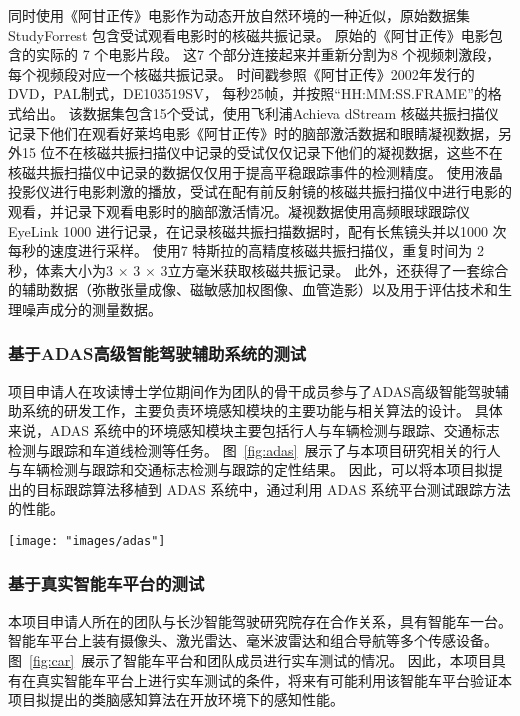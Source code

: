\documentclass[a4paper,zihao=-4]{article}
\begin{document}
同时使用《阿甘正传》电影作为动态开放自然环境的一种近似，原始数据集StudyForrest 包含受试观看电影时的核磁共振记录。
原始的《阿甘正传》电影包含的实际的 7 个电影片段。
这7 个部分连接起来并重新分割为8 个视频刺激段，每个视频段对应一个核磁共振记录。
时间戳参照《阿甘正传》2002年发行的DVD，PAL制式，DE103519SV， 每秒25帧，并按照“HH:MM:SS.FRAME”的格式给出。
该数据集包含15个受试，使用飞利浦Achieva dStream 核磁共振扫描仪记录下他们在观看好莱坞电影《阿甘正传》时的脑部激活数据和眼睛凝视数据，另外15 位不在核磁共振扫描仪中记录的受试仅仅记录下他们的凝视数据，这些不在核磁共振扫描仪中记录的数据仅仅用于提高平稳跟踪事件的检测精度。
使用液晶投影仪进行电影刺激的播放，受试在配有前反射镜的核磁共振扫描仪中进行电影的观看，并记录下观看电影时的脑部激活情况。凝视数据使用高频眼球跟踪仪EyeLink 1000 进行记录，在记录核磁共振扫描数据时，配有长焦镜头并以1000 次每秒的速度进行采样。
使用7 特斯拉的高精度核磁共振扫描仪，重复时间为 2 秒，体素大小为3 $\times$ 3 $\times$ 3立方毫米获取核磁共振记录。
此外，还获得了一套综合的辅助数据（弥散张量成像、磁敏感加权图像、血管造影）以及用于评估技术和生理噪声成分的测量数据。


\subsubsection{基于ADAS高级智能驾驶辅助系统的测试}
项目申请人在攻读博士学位期间作为团队的骨干成员参与了ADAS高级智能驾驶辅助系统的研发工作，主要负责环境感知模块的主要功能与相关算法的设计。
具体来说，ADAS 系统中的环境感知模块主要包括行人与车辆检测与跟踪、交通标志检测与跟踪和车道线检测等任务。
图~\ref{fig:adas}~展示了与本项目研究相关的行人与车辆检测与跟踪和交通标志检测与跟踪的定性结果。
因此，可以将本项目拟提出的目标跟踪算法移植到 ADAS 系统中，通过利用 ADAS 系统平台测试跟踪方法的性能。

\begin{figure*}[htb!]
	\centering  
	{\texttt{[image: "images/adas"]}
	}
	\caption{ADAS 系统中行人与车辆和交通标志检测与跟踪结果}
	\label{fig:adas}
\end{figure*}


\subsubsection{基于真实智能车平台的测试}
本项目申请人所在的团队与长沙智能驾驶研究院存在合作关系，具有智能车一台。
智能车平台上装有摄像头、激光雷达、毫米波雷达和组合导航等多个传感设备。
图~\ref{fig:car}~展示了智能车平台和团队成员进行实车测试的情况。
因此，本项目具有在真实智能车平台上进行实车测试的条件，将来有可能利用该智能车平台验证本项目拟提出的类脑感知算法在开放环境下的感知性能。
\end{document}
